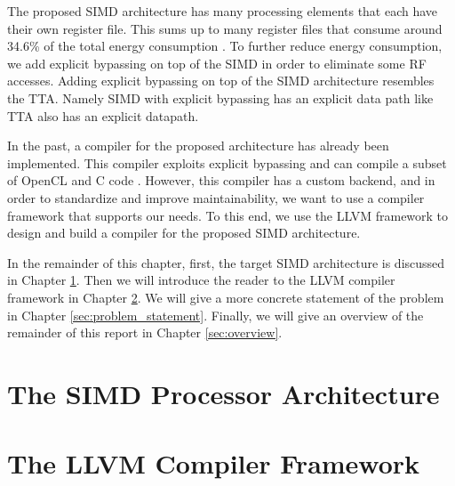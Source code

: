 The proposed SIMD architecture has many processing elements that each have their own register file. This sums up to many register files that consume around 34.6\% of the total energy consumption \cite{dongrio1}. To further reduce energy consumption, we add explicit bypassing on top of the SIMD in order to eliminate some RF accesses. Adding explicit bypassing on top of the SIMD architecture resembles the TTA. Namely SIMD with explicit bypassing has an explicit data path like TTA also has an explicit datapath.

In the past, a compiler for the proposed architecture has already been implemented. This compiler exploits explicit bypassing \cite{dongrio1} and can compile a subset of OpenCL and C code \cite{dongrio2}. However, this compiler has a custom backend, and in order to standardize and improve maintainability, we want to use a compiler framework that supports our needs. To this end, we use the LLVM framework to design and build a compiler for the proposed SIMD architecture.


In the remainder of this chapter, first, the target SIMD architecture is discussed in Chapter \ref{sec:simd}. Then we will introduce the reader to the LLVM compiler framework in Chapter \ref{sec:llvm}. We will give a more concrete statement of the problem in Chapter \ref{sec:problem_statement}. Finally, we will give an overview of the remainder of this report in Chapter \ref{sec:overview}.

\section{The SIMD Processor Architecture}\label{sec:simd}


\section{The LLVM Compiler Framework}\label{sec:llvm}


